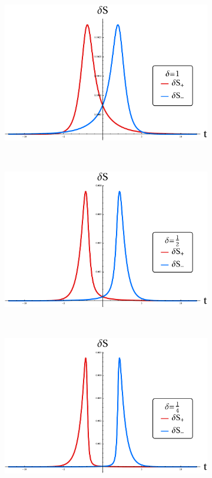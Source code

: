 \documentclass[11pt,oneside,letterpaper]{article}
\numberwithin{equation}{section}
\begin{document}
\begin{spacing}{1.1}
\begin{figure}[h!]
    \centering
    \begin{subfigure}[b]{0.4\textwidth}
        \includegraphics[width=\textwidth]{figures/delta_1.pdf}
        \caption{}
        \label{fig:}
    \end{subfigure}
~
    \begin{subfigure}[b]{0.4\textwidth}
        \includegraphics[width=\textwidth]{figures/delta_1_2.pdf}
        \caption{}
        \label{fig:}
    \end{subfigure}
  ~
    \begin{subfigure}[b]{0.4\textwidth}
        \includegraphics[width=\textwidth]{figures/delta_1_4.pdf}

\end{subfigure}
\end{figure}
\end{spacing}
\end{document}
